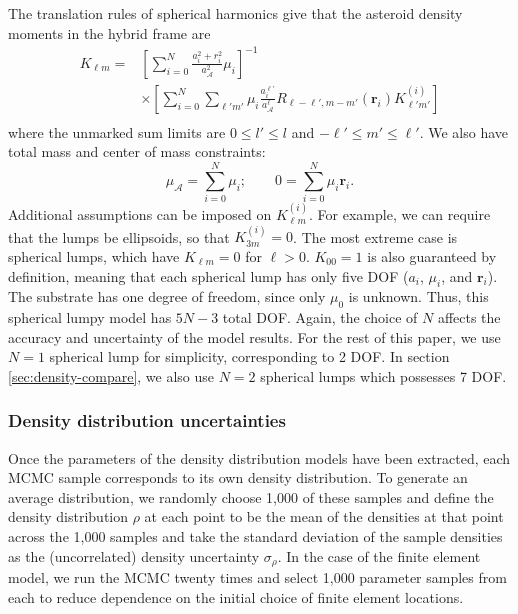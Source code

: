 \documentclass[fleqn,usenatbib]{mnras}
\newcommand{\brackets}[1]{\left[ #1 \right]}
\begin{document}
The translation rules of spherical harmonics \citep{Gelderen1998TheSO} give that the asteroid density moments in the hybrid frame are
\begin{equation}
  \begin{aligned}
    K_{\ell m} = &\brackets{\sum_{i=0}^N \frac{a_i^2 + r_i^2}
    {a_\mathcal{A}^2}\mu_i}^{-1} \\
    &\times \brackets{\sum_{i=0}^N \sum_{\ell' m'}\mu_i
    \frac{a_i^{\ell'}}{a_\mathcal{A}^\ell}
    R_{\ell - \ell', m - m'}(\bm r_i)K_{\ell' m'}^{(i)}} \\
  \end{aligned}
\end{equation}
where the unmarked sum limits are $0 \leq l' \leq l$ and $-\ell' \leq m' \leq \ell'$. We also have total mass and center of mass constraints:
\begin{equation}
  \mu_\mathcal{A} = \sum_{i=0}^N \mu_i;  \qquad 0 = \sum_{i=0}^N \mu_i \bm r_i.
\end{equation}
Additional assumptions can be imposed on $K_{\ell m}^{(i)}$. For example, we can require that the lumps be ellipsoids, so that $K_{3 m}^{(i)} = 0$. The most extreme case is spherical lumps, which have $K_{\ell m} = 0$ for $\ell > 0$. $K_{00}=1$ is also guaranteed by definition, meaning that each spherical lump has only five DOF ($a_i$, $\mu_i$, and $\bm r_i$). The substrate has one degree of freedom, since only $\mu_0$ is unknown. Thus, this spherical lumpy model has $5N - 3$ total DOF. Again, the choice of $N$ affects the accuracy and uncertainty of the model results. For the rest of this paper, we use $N=1$ spherical lump for simplicity, corresponding to 2 DOF. In section \ref{sec:density-compare}, we also use $N=2$ spherical lumps which possesses 7 DOF.


\subsubsection{Density distribution uncertainties}
\label{sec:density-uncertainty-model}

Once the parameters of the density distribution models have been extracted, each MCMC sample corresponds to its own density distribution. To generate an average distribution, we randomly choose 1,000 of these samples and define the density distribution $\rho$ at each point to be the mean of the densities at that point across the 1,000 samples and take the standard deviation of the sample densities as the (uncorrelated) density uncertainty $\sigma_\rho$. In the case of the finite element model, we run the MCMC twenty times and select 1,000 parameter samples from each to reduce dependence on the initial choice of finite element locations. 
\end{document}
